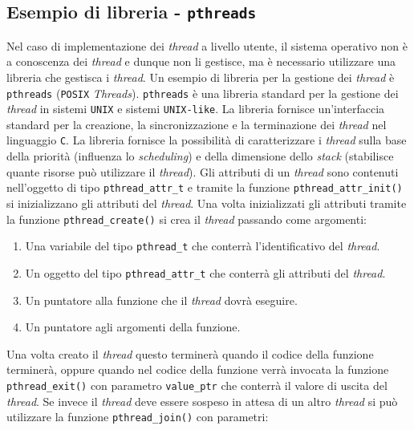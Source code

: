     \subsection{Esempio di libreria - \texttt{pthreads}}
        Nel caso di implementazione dei \textit{thread} a livello utente, il sistema operativo non è a conoscenza dei \textit{thread} e dunque non li gestisce, ma è necessario utilizzare una libreria che gestisca i \textit{thread}. Un esempio di libreria per la gestione dei \textit{thread} è \texttt{pthreads} (\texttt{POSIX} \textit{Threads}).\newline
        \texttt{pthreads} è una libreria standard per la gestione dei \textit{thread} in sistemi \texttt{UNIX} e sistemi \texttt{UNIX-like}. La libreria fornisce un'interfaccia standard per la creazione, la sincronizzazione e la terminazione dei \textit{thread} nel linguaggio \texttt{C}. La libreria fornisce la possibilità di caratterizzare i \textit{thread} sulla base della priorità (influenza lo \textit{scheduling}) e della dimensione dello \textit{stack} (stabilisce quante risorse può utilizzare il \textit{thread}).\newline
        Gli attributi di un \textit{thread} sono contenuti nell'oggetto di tipo \texttt{pthread\_attr\_t} e tramite la funzione \texttt{pthread\_attr\_init()} si inizializzano gli attributi del \textit{thread}. Una volta inizializzati gli attributi tramite la funzione \texttt{pthread\_create()} si crea il \textit{thread} passando come argomenti:
        \begin{enumerate}
            \item Una variabile del tipo \texttt{pthread\_t} che conterrà l'identificativo del \textit{thread}.
            \item Un oggetto del tipo \texttt{pthread\_attr\_t} che conterrà gli attributi del \textit{thread}.
            \item Un puntatore alla funzione che il \textit{thread} dovrà eseguire.
            \item Un puntatore agli argomenti della funzione.
        \end{enumerate}
        Una volta creato il \textit{thread} questo terminerà quando il codice della funzione terminerà, oppure quando nel codice della funzione verrà invocata la funzione \texttt{pthread\_exit()} con parametro \texttt{value\_ptr} che conterrà il valore di uscita del \textit{thread}. Se invece il \textit{thread} deve essere sospeso in attesa di un altro \textit{thread} si può utilizzare la funzione \texttt{pthread\_join()} con parametri:
